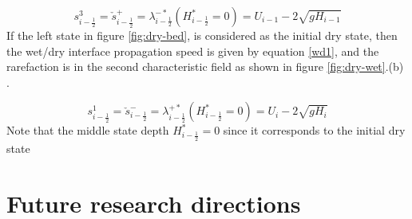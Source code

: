 \documentclass[12pt,a4paper]{article}
\begin{document}
	\begin{equation}
		s_{i-\frac{1}{2}}^{3} = \check{s}_{i-\frac{1}{2}}^{+} = \lambda_{i-\frac{1}{2}}^{-*}(H^{*}_{i-\frac{1}{2}}=0)= U_{i-1} - 2\sqrt{gH_{i-1}}
		\label{wd0}
	\end{equation}
	If the left state in figure \ref{fig:dry-bed}, is considered as the initial dry state, then the  wet/dry interface propagation  speed  is given by equation \eqref{wd1}, and the  rarefaction is in the second characteristic field  as shown in figure \ref{fig:dry-wet}.(b) \cite{ge:2008}.
	
	\begin{equation}
		s_{i-\frac{1}{2}}^{1} = \check{s}_{i-\frac{1}{2}}^{-} = \lambda_{i-\frac{1}{2}}^{+*}(H^{*}_{i-\frac{1}{2}}=0)= U_{i} - 2\sqrt{gH_{i}}
		\label{wd1}
	\end{equation}
	Note that the middle state depth $H^{*}_{i-\frac{1}{2}}=0$ since it corresponds to the initial dry state
	\section{ Future research directions}
	
	
	
	
	
	
	
	
\end{document}
